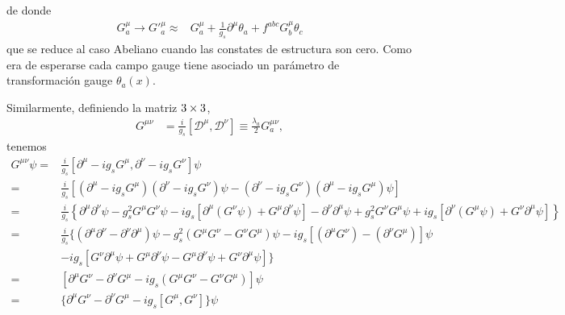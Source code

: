 de donde
\begin{align}
  \label{eq:gmutrinf}
  G^\mu_a\to {G'}^\mu_a\approx&G^\mu_a+\frac{1}{g_s}\partial^\mu\theta_a+f^{abc}G^\mu_b\theta_c
\end{align}
que se reduce al caso Abeliano cuando las constates de estructura son cero. Como era de esperarse cada campo gauge tiene asociado un parámetro de transformación gauge $\theta_a(x)$.




Similarmente, definiendo la matriz $3\times 3$, 
\begin{align}
  \label{eq:gmunu}
  {{G}}^{\mu\nu}&=\frac{i}{g_s}[\mathcal{D}^\mu,\mathcal{D}^\nu]\equiv\frac{\lambda_a}{2}G^{\mu\nu}_a,
\end{align}
tenemos
\begin{align}
  \label{eq:164qft}
   {G}^{\mu\nu}\psi =&\frac{i}{g_s}[\partial^\mu-ig_sG^\mu,\partial^\nu-ig_sG^\nu]\psi\nonumber\\
  =&\frac{i}{g_s}\left[\left(\partial^\mu-ig_sG^\mu\right)\left(\partial^\nu-ig_sG^\nu\right)\psi
    -\left(\partial^\nu-ig_sG^\nu\right)\left(\partial^\mu-ig_sG^\mu\right)\psi\right]\nonumber\\
  =&\frac{i}{g_s}\left\{\partial^\mu\partial^\nu\psi-g_s^2G^\mu G^\nu\psi-ig_s[\partial^\mu(G^\nu\psi)+G^\mu\partial^\nu\psi]
    -\partial^\nu\partial^\mu\psi+g_s^2G^\nu G^\mu\psi+ig_s[\partial^\nu(G^\mu\psi)+G^\nu\partial^\mu\psi]\right\}\nonumber\\
  =&\frac{i}{g_s}\{(\partial^\mu\partial^\nu-\partial^\nu\partial^\mu)\psi-g_s^2(G^\mu G^\nu-G^\nu G^\mu)\psi
  -ig_s[(\partial^\mu G^\nu)-(\partial^\nu G^\mu)]\psi\nonumber\\
  &-ig_s[G^\nu\partial^\mu\psi+G^\mu\partial^\nu\psi-G^\mu\partial^\nu\psi+G^\nu\partial^\mu\psi]\}\nonumber\\
=&[\partial^\mu G^\nu-\partial^\nu G^\mu-ig_s(G^\mu G^\nu-G^\nu G^\mu)]\psi\nonumber\\
=&\{\partial^\mu G^\nu-\partial^\nu G^\mu-ig_s[G^\mu,G^\nu]\}\psi
\end{align}

